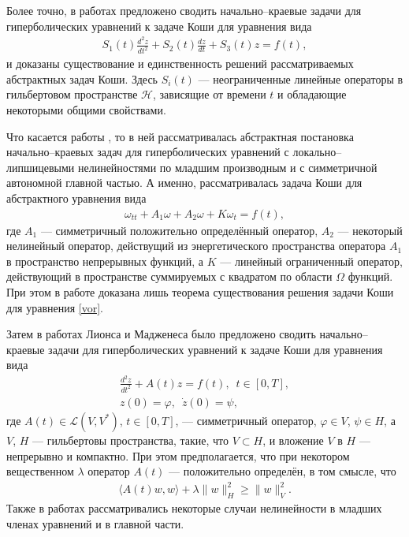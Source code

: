 \documentclass{report}
\begin{document}
Более точно, в работах \cite{Lad1954,Lad1956,Lad1958} предложено сводить начально--краевые задачи для гиперболических уравнений к задаче Коши для уравнения вида
\begin{gather}\label{Lad.abstr}
S_1(t)\frac{d^2z}{dt^2}+S_2(t)\frac{dz}{dt}+S_3(t)z=f(t),
\end{gather}
и доказаны существование и единственность решений рассматриваемых абстрактных задач Коши. Здесь  $S_i(t)$ --- неограниченные линейные операторы в гильбертовом пространстве $\mathcal{H}$,
зависящие от времени $t$ и обладающие некоторыми общими свойствами.


Что касается работы \cite{Vorovich}, то в ней рассматривалась абстрактная постановка начально--краевых задач для гиперболических уравнений с локально--липшицевыми нелинейностями по младшим
производным и с симметричной автономной главной частью. А именно, рассматривалась задача Коши для абстрактного уравнения вида
\begin{gather}\label{vor}
\omega_{tt}+A_1\omega+A_2\omega+K\omega_t=f(t),
\end{gather}
где $A_1$ --- симметричный положительно определённый оператор, $A_2$ --- некоторый нелинейный оператор, действущий из энергетического пространства оператора $A_1$ в пространство непрерывных
функций, а $K$ --- линейный ограниченный оператор, действующий в пространстве суммируемых с квадратом по области $\Omega$ функций. При этом в работе \cite{Vorovich} доказана лишь теорема
существования решения задачи Коши для уравнения \eqref{vor}.

Затем в работах Лионса и Мадженеса \cite{Lions1972,LionsMajenes} было предложено сводить начально--краевые задачи для гиперболических уравнений к задаче Коши для уравнения вида
\begin{gather}\label{Lions.abstr}
\frac{d^2z}{dt^2}+A(t)z=f(t),\,\,\,t\in[0,T],\\
z(0)=\varphi,\,\,\,\dot{z}(0)=\psi,
\end{gather}
где $A(t)\in\mathcal{L}(V,V^*)$, $t\in[0,T]$, --- симметричный оператор, $\varphi\in V$, $\psi\in H$, а $V$, $H$ --- гильбертовы пространства, такие, что $V\subset H$, и вложение $V$ в $H$
--- непрерывно и компактно. При этом предполагается, что при некотором вещественном $\lambda$ оператор $A(t)$ --- положительно определён, в том смысле, что
\begin{gather*}
\langle A(t)w,w\rangle+\lambda\|w\|^2_H\geqslant\|w\|^2_V.
\end{gather*}
Также в работах \cite{Lions1972,LionsMajenes} рассматривались некоторые случаи нелинейности в младших членах уравнений и в главной части.
\end{document}
